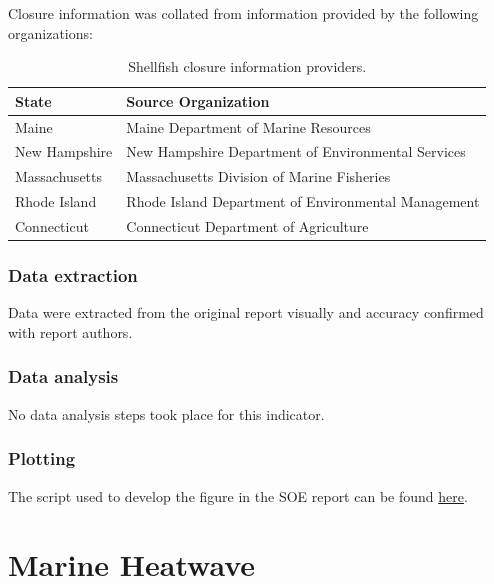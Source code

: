 \documentclass[
]{book}
\begin{document}
Closure information was collated from information provided by the following organizations:

\begin{table}

\caption{\label{tab:closuresrc}Shellfish closure information providers.}
\centering
\begin{tabular}[t]{ll}
\toprule
State & Source Organization\\
\midrule
Maine & Maine Department of Marine Resources\\
New Hampshire & New Hampshire Department of Environmental Services\\
Massachusetts & Massachusetts Division of Marine Fisheries\\
Rhode Island & Rhode Island Department of Environmental Management\\
Connecticut & Connecticut Department of Agriculture\\
\bottomrule
\end{tabular}
\end{table}

\hypertarget{data-extraction-21}{%
\subsection{Data extraction}\label{data-extraction-21}}

Data were extracted from the original report visually and accuracy confirmed with report authors.

\hypertarget{data-analysis-22}{%
\subsection{Data analysis}\label{data-analysis-22}}

No data analysis steps took place for this indicator.

\hypertarget{plotting-16}{%
\subsection{Plotting}\label{plotting-16}}

The script used to develop the figure in the SOE report can be found \href{https://github.com/NOAA-EDAB/tech-doc/tree/master/R/stored_scripts/ne_hab_plotting.R}{here}.

\hypertarget{marine-heatwave}{%
\chapter{Marine Heatwave}\label{marine-heatwave}}
\end{document}
